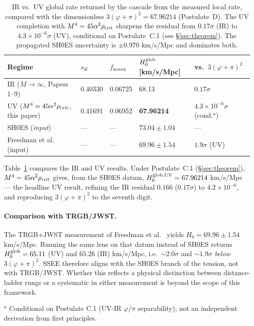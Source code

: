 \documentclass[12pt,a4paper]{article}
\newcommand{\phiG}{\varphi}
\newcommand{\fsc}{f_{\mathrm{screen}}}
\newcommand{\sK}{s_K}
\newcommand{\rhoc}{\rho_{\rm crit}}
\begin{document}
\begin{table}[ht]
\centering
\caption{%
IR vs.\ UV global rate returned by the cascade from the measured local
  rate, compared with the dimensionless $3(\phiG+\pi)^2 = 67.96214$
  (Postulate~D). The UV completion with $M^4 = 45\alpha^2\rhoc$ sharpens the
  residual from $0.17\sigma$ (IR) to $4.3\times10^{-6}\sigma$ (UV),
  conditional on Postulate~C.1 (see §\ref{sec:theorem}). The propagated SH0ES
  uncertainty is $\pm0.970$ km/s/Mpc and dominates both.
}
\label{tab:H0}
\begin{tabular}{lllll}
\toprule
Regime & $\sK$ & $\fsc$ & $H_0^{\rm glob}$ [km/s/Mpc] & vs.\ $3(\phiG+\pi)^2$ \\
\midrule
IR ($M\to\infty$, Papers 1--9) & 0.40330 & 0.06725 & 68.13 & $0.17\sigma$ \\
UV ($M^4=45\alpha^2\rhoc$, this paper) & 0.41691 & 0.06952 & \textbf{67.96214} & $4.3{\times}10^{-6}\sigma$ (cond.$^{a}$) \\
\midrule
SH0ES \citep{Riess2022} (\emph{input}) & --- & --- & $73.04 \pm 1.04$  & --- \\
Freedman et al.\ \citep{Freedman2024} (input) & --- & --- & $69.96 \pm 1.54$ & $1.9\sigma$ (UV) \\
\bottomrule
\end{tabular}
\end{table}

Table~\ref{tab:H0} compares the IR and UV results.
Under Postulate~C.1 (§\ref{sec:theorem}), $M^4 = 45\alpha^2\rhoc$ gives, from
the SH0ES datum, $H_0^{\rm glob,UV} = 67.96214$ km/s/Mpc --- the headline UV
result, refining the IR residual $0.166$ ($0.17\sigma$) to
$4.2\times10^{-6}$, and reproducing $3(\phiG+\pi)^2$ to the seventh digit.

\paragraph{Comparison with TRGB/JWST.}
The TRGB+JWST measurement of Freedman et al.\ \citep{Freedman2024} yields
$H_0 = 69.96\pm1.54$\,km/s/Mpc. Running the same lens on that datum instead of
SH0ES returns $H_0^{\rm glob} = 65.11$ (UV) and $65.26$ (IR) km/s/Mpc, i.e.\
$\sim2.0\sigma$ and $\sim1.9\sigma$ \emph{below} $3(\phiG+\pi)^2$.
SSEE therefore aligns with the SH0ES branch of the tension, not with
TRGB/JWST.  Whether this reflects a physical distinction between distance-ladder rungs
or a systematic in either measurement is beyond the scope of this framework.

\footnotesize{$^{a}$ Conditional on Postulate C.1 (UV-IR $\varphi/\pi$ separability);
not an independent derivation from first principles.}
\end{document}
